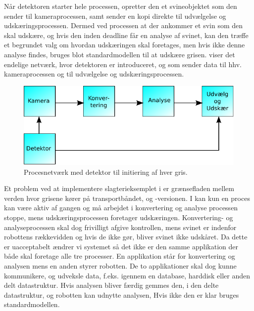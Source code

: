 Når detektoren starter hele processen, opretter den et svineobjektet som den sender til kameraprocessen, samt sender en kopi direkte til udvælgelse og udskæringsprocessen. Dermed ved processen at der ankommer et svin som den skal udskære, og hvis den inden deadline får en analyse af svinet, kan den træffe et begrundet valg om hvordan udskæringen skal foretages,  men hvis ikke denne analyse findes, bruges blot standardmodellen til at udskære grisen.  viser det endelige  netværk, hvor detektoren er introduceret, og som sender data til hhv. kameraprocessen og til udvælgelse og udskæringsprocessen. 

\begin{figure}
 \begin{center}
  \includegraphics[scale=1]{images/pig-network2}
	\caption{Procesnetværk med detektor til initiering af hver gris.}
	\label{fig:pig-network2}
\end{center}
\end{figure}

Et problem ved at implementere  slagterieksemplet i \pycsp er  grænsefladen mellem verden hvor grisene kører på transportbåndet, og  -versionen.  I \pycsp  kan  kun en proces kan være aktiv af gangen og må arbejdet i  konvertering og analyse processen stoppe, mens  udskæringsprocessen foretager udskæringen. Konvertering- og analyseprocessen  skal dog frivilligt afgive kontrollen, mens svinet er indenfor robottens rækkevidden og hvis de ikke gør, bliver svinet ikke udskåret. Da dette er uacceptabelt ændrer vi systemet så det ikke er den samme applikation der både skal foretage alle tre processer. En applikation står for konvertering og analysen mens en anden  styrer robotten. De to applikationer skal dog kunne kommunikere, og  udveksle data, f.eks. igennem en database, harddisk eller anden delt datastruktur. Hvis analysen bliver færdig gemmes den, i den delte datastruktur, og robotten kan udnytte analysen, Hvis ikke den er klar bruges standardmodellen.    

